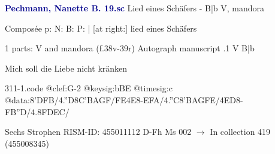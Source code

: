 \documentclass[twocolumn]{book}
\begin{document}
\newline \par \vspace{7pt} \textcolor{darkblue}{\textbf{Pechmann, Nanette B.  19.sc}}
\newline Lied eines Schäfers - B|b
\newline V, mandora
\newline \begin{itshape}[heading, f.38v:] Composée p: N: B: P: | [at right:] lied eines Schäfers\end{itshape} 
\newline \textcolor{darkblue}{}  1 parts: V and mandora  (f.38v-39r)
\newline Autograph manuscript
.1  V  B|b
\newline \begin{footnotesize} Mich soll die Liebe nicht kränken \end{footnotesize}  
\begin{filecontents*}{311-1.code}
@clef:G-2
@keysig:bBE
@timesig:c
@data:8'DFB/4.''D8C'BAGF/{FE}4E8-EFA/4.''C8'BAGFE/4ED8-FB''D/4.8FDEC/
\end{filecontents*}
\newline
%

\newline Sechs Strophen
\newline RISM-ID: 455011112
\newline D-Fh  Ms 002
\newline $\rightarrow$ In collection 419 (455008345)
      
\end{document}
